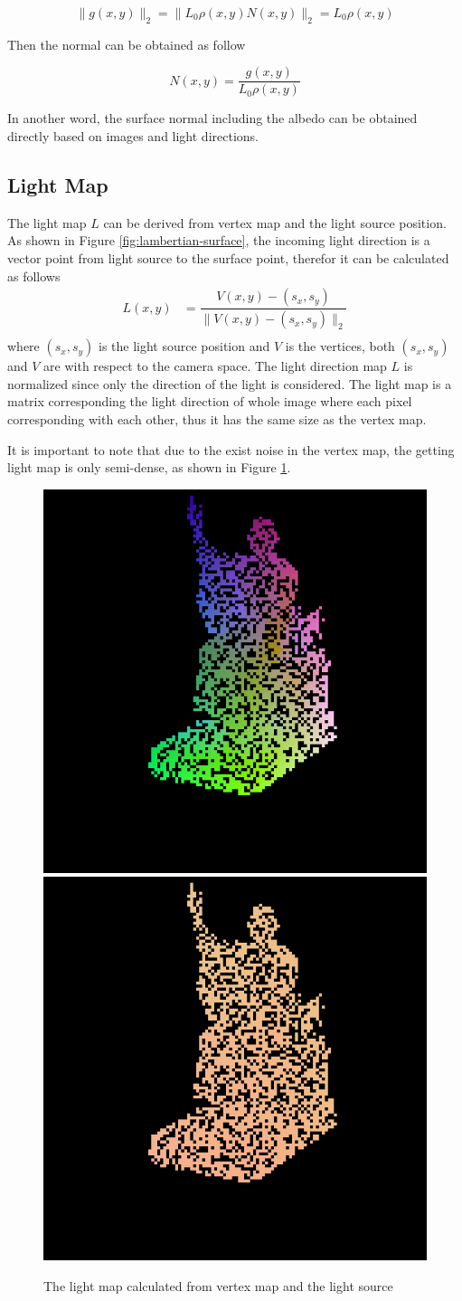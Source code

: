 \documentclass[border=15pt, multi, tikz]{article}
\begin{document}
\[ \|g(x,y)\|_2 = \|L_0\rho(x,y)N(x,y)\|_2 = L_0\rho(x,y) \]

Then the normal can be obtained as follow

\[  N(x,y) = \frac{g(x,y)}{L_0\rho(x,y)}\]

In another word, the surface normal including the albedo can be obtained directly based on images and light directions. 


\subsection{Light Map}
\label{sec:lightmap}
The light map $ L $ can be derived from vertex map and the light source position. As shown in Figure \ref{fig:lambertian-surface}, the incoming light direction is a vector point from light source to the surface point, therefor it can be calculated as follows
\begin{equation}\label{light-direction}
	\begin{array}{ll}
		L(x,y)&= \dfrac{V(x,y)-(s_x,s_y)}{\|V(x,y)-(s_x,s_y)\|_2}\\ 
	\end{array}
\end{equation}
where $ (s_x,s_y) $ is the light source position and $ V $ is the vertices, both $  (s_x,s_y) $ and  $ V $ are with respect to the camera space. The light direction map $ L $ is normalized since only the direction of the light is considered. 
The light map is a matrix corresponding the light direction of whole image where each pixel corresponding with each other, thus it has the same size as the vertex map.


It is important to note that due to the exist noise in the vertex map, the getting light map is only semi-dense, as shown in Figure \ref{fig:light-input}. 

\begin{figure}[th]
	\centering
	{\includegraphics[width=.4\textwidth]{./Figures/intrinsic_image_vertex_input.png}}
	{\includegraphics[width=.4\textwidth]{./Figures/intrinsic_image_light_input.png}}
	\caption{The light map calculated from vertex map and the light source}
	\label{fig:light-input}
\end{figure}
\end{document}
